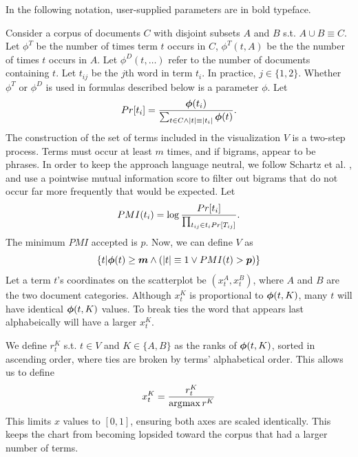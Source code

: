 \documentclass[11pt,a4paper]{article}
\begin{document}
In the following notation, user-supplied parameters are in bold typeface. 

Consider a corpus of documents $C$ with disjoint subsets $A$ and $B$ s.t. $A \cup B \equiv C$. Let $\phi^T$ be the number of times term $t$ occurs in $C$, $\phi^{T}(t,A)$ be the the number of times $t$ occurs in $A$. Let $\phi^{D}(t,\ldots)$ refer to the number of documents containing $t$.  Let $t_{ij}$ be the $j$th word in term $t_i$.  In practice, $j \in \{1,2\}$.   Whether $\phi^T$ or $\phi^D$ is used in formulas described below is a parameter \mbox{\boldmath$\phi$}.  Let
\begin{equation}
\vspace{-.2cm}
Pr[t_i] = \frac{\mbox{\boldmath$\phi$}(t_i)}{\sum_{t \in C\wedge|t|\equiv|t_i|} \mbox{\boldmath$\phi$}(t)}.
\vspace{-.1cm}
\end{equation}
The construction of the set of terms included in the visualization $V$ is a two-step process. Terms must occur at least \mbox{\boldmath$m$} times, and if bigrams, appear to be phrases.  In order to keep the approach language neutral, we follow Schartz et al. , and use a pointwise mutual information score to filter out bigrams that do not occur far more frequently that would be expected.  Let
\begin{equation}
\vspace{-.2cm}
PMI(t_i) = \log \frac{Pr[t_i]}{\prod_{t_{ij}\in t_i{Pr[T_{ij}]}}}.
\end{equation}
The minimum $PMI$ accepted is \mbox{\boldmath$p$}. Now, we can define $V$ as 
\begin{equation}
\{t|\mbox{\boldmath$\phi$}(t)\geq\mbox{\boldmath$m$} \wedge (|t| \equiv 1 \vee PMI(t) > \mbox{\boldmath$p$})\}
\end{equation}
Let a term $t$'s coordinates on the scatterplot be $(x^{A}_{t}, x^{B}_t)$, where $A$ and $B$ are the two document categories. Although $x^{K}_t$ is proportional to $\mbox{\boldmath$\phi$}(t,K)$, many $t$ will have identical $\mbox{\boldmath$\phi$}(t,K)$ values.  To break ties the word that appears last alphabeically will have a larger $x^{K}_t$.

We define $r^{K}_t$ s.t. $t \in V$ and $K \in \{A,B\}$ as the ranks of $\mbox{\boldmath$\phi$}(t,K)$, sorted in ascending order, where ties are broken by terms' alphabetical order.  This allows us to define \vspace{-.2cm}
\begin{equation}
\vspace{-.2cm}
x^{K}_t = \frac{r^{K}_t}{\arg\!\max r^{K}}
\end{equation}
This limits $x$ values to $[0,1]$, ensuring both axes are scaled identically.  This keeps the chart from becoming lopsided toward the corpus that had a larger number of terms. 
\end{document}

